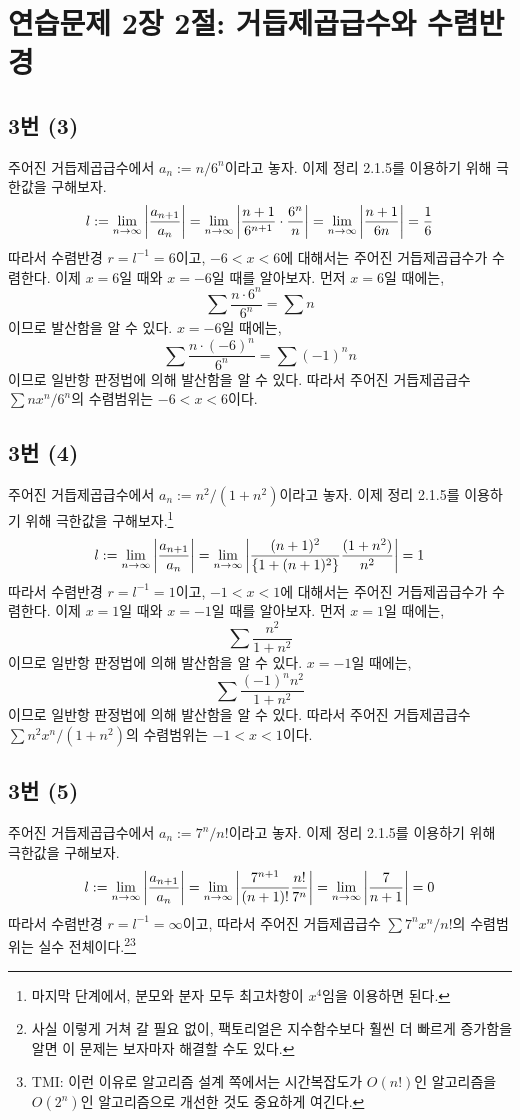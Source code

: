\section{연습문제 2장 2절: 거듭제곱급수와 수렴반경}

\subsection{3번 (3)}
주어진 거듭제곱급수에서 $a_n:=n/6^n$이라고 놓자. 이제 정리 2.1.5를 이용하기 위해 극한값을 구해보자.
\[
l:=\lim_{n\to\infty}\left|\frac{a_{n+1}}{a_n}\right|=\lim_{n\to\infty}\left|\frac{n+1}{6^{n+1}}\cdot\frac{6^n}{n}\right|=\lim_{n\to\infty}\left|\frac{n+1}{6n}\right|=\frac{1}{6}
\]
따라서 수렴반경 $r=l^{-1}=6$이고, $-6<x<6$에 대해서는 주어진 거듭제곱급수가 수렴한다. 이제 $x=6$일 때와 $x=-6$일 때를 알아보자. 먼저 $x=6$일 때에는,
\[
\sum\frac{n\cdot6^n}{6^n}=\sum n
\]
이므로 발산함을 알 수 있다. $x=-6$일 때에는,
\[
\sum\frac{n\cdot(-6)^n}{6^n}=\sum(-1)^n n
\]
이므로 일반항 판정법에 의해 발산함을 알 수 있다. 따라서 주어진 거듭제곱급수 $\sum nx^n/6^n$의 수렴범위는 $-6<x<6$이다.

\subsection{3번 (4)}
주어진 거듭제곱급수에서 $a_n:=n^2/(1+n^2)$이라고 놓자. 이제 정리 2.1.5를 이용하기 위해 극한값을 구해보자.\footnote{마지막 단계에서, 분모와 분자 모두 최고차항이 $x^4$임을 이용하면 된다.}
\[
l:=\lim_{n\to\infty}\left|\frac{a_{n+1}}{a_n}\right|=\lim_{n\to\infty}\left|\frac{(n+1)^2}{\{1+(n+1)^2\}}\frac{(1+n^2)}{n^2}\right|=1
\]
따라서 수렴반경 $r=l^{-1}=1$이고, $-1<x<1$에 대해서는 주어진 거듭제곱급수가 수렴한다. 이제 $x=1$일 때와 $x=-1$일 때를 알아보자. 먼저 $x=1$일 때에는,
\[
\sum\frac{n^2}{1+n^2}
\]
이므로 일반항 판정법에 의해 발산함을 알 수 있다. $x=-1$일 때에는,
\[
\sum\frac{(-1)^n n^2}{1+n^2}
\]
이므로 일반항 판정법에 의해 발산함을 알 수 있다. 따라서 주어진 거듭제곱급수 $\sum n^2x^n/(1+n^2)$의 수렴범위는 $-1<x<1$이다.

\subsection{3번 (5)}
주어진 거듭제곱급수에서 $a_n:=7^n/n!$이라고 놓자. 이제 정리 2.1.5를 이용하기 위해 극한값을 구해보자.
\[
l:=\lim_{n\to\infty}\left|\frac{a_{n+1}}{a_n}\right|=\lim_{n\to\infty}\left|\frac{7^{n+1}}{(n+1)!}\frac{n!}{7^n}\right|=\lim_{n\to\infty}\left|\frac{7}{n+1}\right|=0
\]
따라서 수렴반경 $r=l^{-1}=\infty$이고, 따라서 주어진 거듭제곱급수 $\sum7^nx^n/n!$의 수렴범위는 실수 전체이다.\footnote{사실 이렇게 거쳐 갈 필요 없이, 팩토리얼은 지수함수보다 훨씬 더 빠르게 증가함을 알면 이 문제는 보자마자 해결할 수도 있다.}\footnote{TMI: 이런 이유로 알고리즘 설계 쪽에서는 시간복잡도가 $O(n!)$인 알고리즘을 $O(2^n)$인 알고리즘으로 개선한 것도 중요하게 여긴다.}

